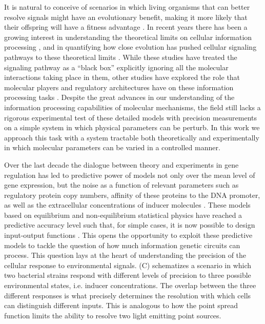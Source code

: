 It is natural to conceive of scenarios in which living organisms that can
better resolve signals might have an evolutionary benefit, making it more
likely that their offspring will have a fitness advantage \cite{Taylor2007}. In
recent years there has been a growing interest in understanding the theoretical
limits on cellular information processing \cite{Bialek2005, Gregor2007}, and in
quantifying how close evolution has pushed cellular signaling pathways to these
theoretical limits \cite{Tkacik2008, Dubuis2013, Petkova2019}. While these
studies have treated the signaling pathway as a ``black box'' explicitly
ignoring all the molecular interactions taking place in them, other studies
have explored the role that molecular players and regulatory architectures have
on these information processing tasks \cite{Rieckh2014, Ziv2007, Voliotis2014a,
Tostevin2009, Tkacik2011, Tkacik2008a, Tabbaa2014}. Despite the great advances
in our understanding of the information processing capabilities of molecular
mechanisms, the field still lacks a rigorous experimental test of these
detailed models with precision measurements on a simple system in which
physical parameters can be perturb. In this work we approach this task with a
system tractable both theoretically and experimentally in which molecular
parameters can be varied in a controlled manner.

Over the last decade the dialogue between theory and experiments in gene
regulation has led to predictive power of models not only over the mean level
of gene expression, but the noise as a function of relevant parameters such as
regulatory protein copy numbers, affinity of these proteins to the DNA
promoter, as well as the extracellular concentrations of inducer molecules
\cite{Golding2005, Garcia2011c, Vilar2013, Xu2015}. These models based on
equilibrium and non-equilibrium statistical physics have reached a predictive
accuracy level such that, for simple cases, it is now possible to design
input-output functions \cite{Brewster2012, Barnes2019}. This opens the
opportunity to exploit these predictive models to tackle the question of how
much information genetic circuits can process. This question lays at the heart
of understanding the precision of the cellular response to environmental
signals. (C) schematizes a scenario in which two bacterial
strains respond with different levels of precision to three possible
environmental states, i.e. inducer concentrations. The overlap between the
three different responses is what precisely determines the resolution with
which cells can distinguish different inputs. This is analogous to how the
point spread function limits the ability to resolve two light emitting point
sources.

